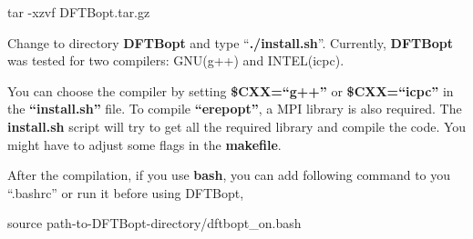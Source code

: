 {\scriptsize
tar -xzvf DFTBopt.tar.gz
}

Change to directory \textbf{DFTBopt} and type ``\textbf{./install.sh}''.
Currently, \textbf{DFTBopt} was tested for two compilers: GNU(g++) and
INTEL(icpc).

You can choose the compiler by setting \textbf{\$CXX=``g++''} or
\textbf{\$CXX=``icpc''} in the \textbf{``install.sh''} file.  To compile
\textbf{``erepopt''}, a MPI library is also required. The
\textbf{install.sh} script will try to get all the required library and
compile the code. You might have to adjust some flags in the
\textbf{makefile}. 

After the compilation, if you use \textbf{bash}, you can add following
command to you ``.bashrc'' or run it before using DFTBopt,

{\scriptsize
source path-to-DFTBopt-directory/dftbopt\_on.bash
}



